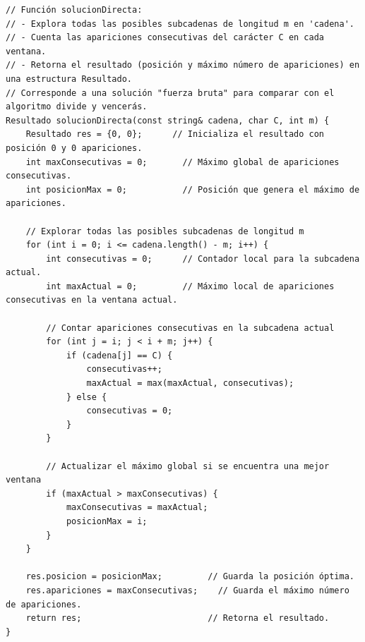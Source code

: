 \documentclass[12pt,a4paper]{article}
\begin{document}
\begin{lstlisting}[caption=Solución directa]
// Función solucionDirecta:
// - Explora todas las posibles subcadenas de longitud m en 'cadena'.
// - Cuenta las apariciones consecutivas del carácter C en cada ventana.
// - Retorna el resultado (posición y máximo número de apariciones) en una estructura Resultado.
// Corresponde a una solución "fuerza bruta" para comparar con el algoritmo divide y vencerás.
Resultado solucionDirecta(const string& cadena, char C, int m) {
    Resultado res = {0, 0};      // Inicializa el resultado con posición 0 y 0 apariciones.
    int maxConsecutivas = 0;       // Máximo global de apariciones consecutivas.
    int posicionMax = 0;           // Posición que genera el máximo de apariciones.
    
    // Explorar todas las posibles subcadenas de longitud m
    for (int i = 0; i <= cadena.length() - m; i++) {
        int consecutivas = 0;      // Contador local para la subcadena actual.
        int maxActual = 0;         // Máximo local de apariciones consecutivas en la ventana actual.
        
        // Contar apariciones consecutivas en la subcadena actual
        for (int j = i; j < i + m; j++) {
            if (cadena[j] == C) {
                consecutivas++;
                maxActual = max(maxActual, consecutivas);
            } else {
                consecutivas = 0;
            }
        }
        
        // Actualizar el máximo global si se encuentra una mejor ventana
        if (maxActual > maxConsecutivas) {
            maxConsecutivas = maxActual;
            posicionMax = i;
        }
    }
    
    res.posicion = posicionMax;         // Guarda la posición óptima.
    res.apariciones = maxConsecutivas;    // Guarda el máximo número de apariciones.
    return res;                         // Retorna el resultado.
}
\end{lstlisting}
\end{document}
